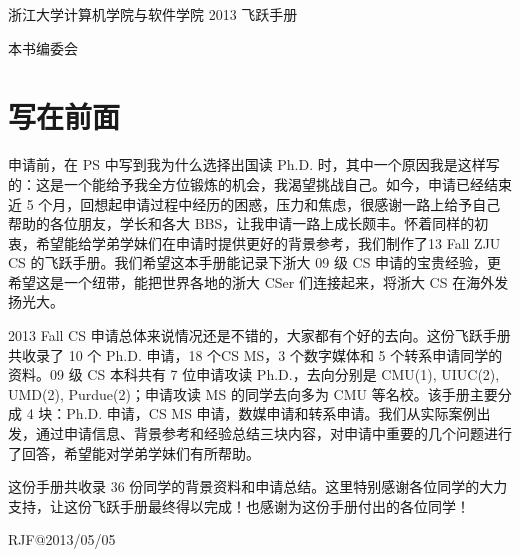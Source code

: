 \documentclass[11pt,fleqn,openany]{book} %
\begin{document}

\begingroup
\thispagestyle{empty}
\centering
\vspace*{9cm}
\par\normalfont\fontsize{35}{35}\sffamily\selectfont
浙江大学计算机学院与软件学院 2013 飞跃手册\par %
\vspace*{1cm}
{\Huge 本书编委会}\par %
\endgroup


\newpage
{}
\chapter*{写在前面}
申请前，在 PS 中写到我为什么选择出国读 Ph.D. 时，其中一个原因我是这样写的：这是一个能给予我全方位锻炼的机会，我渴望挑战自己。如今，申请已经结束近 5 个月，回想起申请过程中经历的困惑，压力和焦虑，很感谢一路上给予自己帮助的各位朋友，学长和各大 BBS，让我申请一路上成长颇丰。怀着同样的初衷，希望能给学弟学妹们在申请时提供更好的背景参考，我们制作了13 Fall ZJU CS 的飞跃手册。我们希望这本手册能记录下浙大 09 级 CS 申请的宝贵经验，更希望这是一个纽带，能把世界各地的浙大 CSer 们连接起来，将浙大 CS 在海外发扬光大。

2013 Fall CS 申请总体来说情况还是不错的，大家都有个好的去向。这份飞跃手册共收录了 10 个 Ph.D. 申请，18 个CS MS，3 个数字媒体和 5 个转系申请同学的资料。09 级 CS 本科共有 7 位申请攻读 Ph.D.，去向分别是 CMU(1), UIUC(2), UMD(2), Purdue(2)；申请攻读 MS 的同学去向多为 CMU 等名校。该手册主要分成 4 块：Ph.D. 申请，CS MS 申请，数媒申请和转系申请。我们从实际案例出发，通过申请信息、背景参考和经验总结三块内容，对申请中重要的几个问题进行了回答，希望能对学弟学妹们有所帮助。

这份手册共收录 36 份同学的背景资料和申请总结。这里特别感谢各位同学的大力支持，让这份飞跃手册最终得以完成！也感谢为这份手册付出的各位同学！

\hfill RJF@2013/05/05

~\vfill
\thispagestyle{empty}
\end{document}
